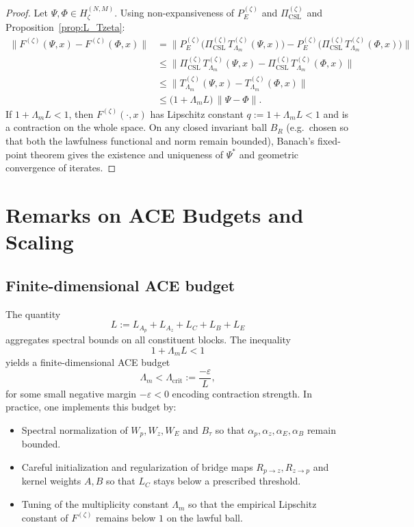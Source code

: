 \documentclass[11pt]{article}
\theoremstyle{definition}
\theoremstyle{plain}
\begin{document}
\begin{proof}
Let $\Psi,\Phi\in H_\zeta^{(N,M)}$.
Using non-expansiveness of $P_E^{(\zeta)}$ and $\Pi_{\mathrm{CSL}}^{(\zeta)}$ and Proposition~\ref{prop:L_Tzeta}:
\begin{align*}
  \|F^{(\zeta)}(\Psi,x) - F^{(\zeta)}(\Phi,x)\|
  &=
  \bigl\|P_E^{(\zeta)}\bigl(\Pi_{\mathrm{CSL}}^{(\zeta)} T_{\Lambda_m}^{(\zeta)}(\Psi,x)\bigr)
       - P_E^{(\zeta)}\bigl(\Pi_{\mathrm{CSL}}^{(\zeta)} T_{\Lambda_m}^{(\zeta)}(\Phi,x)\bigr)\bigr\| \\
  &\le
  \bigl\|\Pi_{\mathrm{CSL}}^{(\zeta)} T_{\Lambda_m}^{(\zeta)}(\Psi,x)
       - \Pi_{\mathrm{CSL}}^{(\zeta)} T_{\Lambda_m}^{(\zeta)}(\Phi,x)\bigr\| \\
  &\le
  \|T_{\Lambda_m}^{(\zeta)}(\Psi,x) - T_{\Lambda_m}^{(\zeta)}(\Phi,x)\| \\
  &\le
  \bigl(1 + \Lambda_m L\bigr)\,\|\Psi-\Phi\|.
\end{align*}
If $1 + \Lambda_m L < 1$, then $F^{(\zeta)}(\cdot,x)$ has Lipschitz constant $q := 1 + \Lambda_m L <1$ and is a contraction on the whole space.
On any closed invariant ball $B_R$ (e.g.\ chosen so that both the lawfulness functional and norm remain bounded), Banach's fixed-point theorem gives the existence and uniqueness of $\Psi^\ast$ and geometric convergence of iterates.
\end{proof}

\section{Remarks on ACE Budgets and Scaling}

\subsection{Finite-dimensional ACE budget}

The quantity
\[
  L := L_{A_p}+L_{A_z}+L_C+L_B+L_E
\]
aggregates spectral bounds on all constituent blocks.
The inequality
\[
  1 + \Lambda_m L < 1
\]
yields a finite-dimensional ACE budget
\[
  \Lambda_m < \Lambda_{\mathrm{crit}} := \frac{-\varepsilon}{L},
\]
for some small negative margin $-\varepsilon<0$ encoding contraction strength.
In practice, one implements this budget by:

\begin{itemize}[leftmargin=*]
  \item Spectral normalization of $W_p,W_z,W_E$ and $B_\tau$ so that $\alpha_p,\alpha_z,\alpha_E,\alpha_B$ remain bounded.
  \item Careful initialization and regularization of bridge maps $R_{p\to z},R_{z\to p}$ and kernel weights $A,B$ so that $L_C$ stays below a prescribed threshold.
  \item Tuning of the multiplicity constant $\Lambda_m$ so that the empirical Lipschitz constant of $F^{(\zeta)}$ remains below $1$ on the lawful ball.
\end{itemize}
\end{document}
